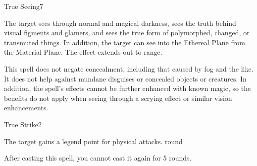 \begin{spellsection}{True Seeing}{7}
    \begin{spellheader}
    \end{spellheader}
    \begin{spellcontent}
        \begin{spelltargetinginfo}
        \end{spelltargetinginfo}
        \begin{spelleffects}
            \spelleffect The target sees through normal and magical darkness, sees the truth behind visual figments and glamers, and sees the true form of polymorphed, changed, or transmuted things. In addition, the target can see into the Ethereal Plane from the Material Plane. The effect extends out to \rngmed range.
            \spelldur \durshort
        \end{spelleffects}
    \end{spellcontent}
    \begin{spellfooter}
        \spellnotes This spell does not negate concealment, including that caused by fog and the like. It does not help against mundane disguises or concealed objects or creatures. In addition, the spell's effects cannot be further enhanced with known magic, so the benefits do not apply when seeing through a scrying effect or similar vision enhancements.
        \miscastexplode
    \end{spellfooter}
\end{spellsection}

\begin{spellsection}{True Strike}{2}
    \begin{spellheader}
    \end{spellheader}
    \begin{spellcontent}
        \begin{spelltargetinginfo}
        \end{spelltargetinginfo}
        \begin{spelleffects}
            \spelleffect The target gains a legend point for physical attacks.
             round
        \end{spelleffects}
    \end{spellcontent}
    \begin{spellfooter}
        \spellnotes After casting this spell, you cannot cast it again for 5 rounds.
        \miscastrandom
    \end{spellfooter}
\end{spellsection}

